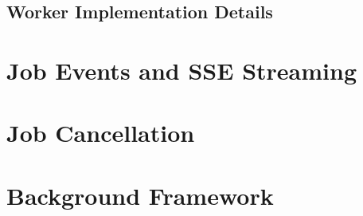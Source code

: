 \documentclass[a4paper,twoside]{sapthesis}
\begin{document}
\subsection{Worker Implementation Details}
%
%
%
%
%

\section{Job Events and SSE Streaming}
\label{sec:job-events}

\section{Job Cancellation}
\label{sec:job-cancellation}

\section{Background Framework}
\label{sec:background-framework}
\end{document}
